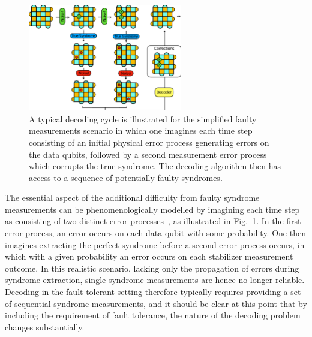 \documentclass[twocolumn,preprintnumbers,amsmath,amssymb,notitlepage,nofootinbib,longbibliography,superscriptaddress,aps,pra,10pt]{revtex4-1}
\begin{document}
	\begin{figure}
		\centering
		\includegraphics[width=0.6\textwidth]{figures/decoding_problem.pdf}
		\caption{
			A typical decoding cycle is illustrated for the simplified faulty measurements scenario in which one imagines each time step consisting of an initial physical error process generating errors on the data qubits, followed by a second measurement error process which corrupts the true syndrome.
			The decoding algorithm then has access to a sequence of potentially faulty syndromes.
		}
		\label{f:decoding_problem}
	\end{figure}

	The essential aspect of the additional difficulty from faulty syndrome measurements can be phenomenologically modelled by imagining each time step as consisting of two distinct error processes~\cite{stephens2014fault}, as illustrated in Fig.~\ref{f:decoding_problem}.
	In the first error process, an error occurs on each data qubit with some probability.
	One then imagines extracting the perfect syndrome before a second error process occurs, in which with a given probability an error occurs on each stabilizer measurement outcome.
	In this realistic scenario, lacking only the propagation of errors during syndrome extraction, single syndrome measurements are hence no longer reliable.
	Decoding in the fault tolerant setting therefore typically requires providing a set of sequential syndrome measurements, and it should be clear at this point that by including the requirement of fault tolerance, the nature of the decoding problem changes substantially.
\end{document}
